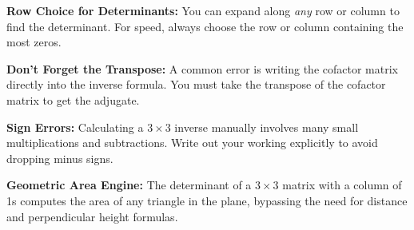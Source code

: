 \begin{takeaways}
\item \textbf{Row Choice for Determinants:} You can expand along \emph{any} row or column to find the determinant. For speed, always choose the row or column containing the most zeros.
\item \textbf{Don't Forget the Transpose:} A common error is writing the cofactor matrix directly into the inverse formula. You must take the transpose of the cofactor matrix to get the adjugate.
\item \textbf{Sign Errors:} Calculating a $3 \times 3$ inverse manually involves many small multiplications and subtractions. Write out your working explicitly to avoid dropping minus signs.
\item \textbf{Geometric Area Engine:} The determinant of a $3 \times 3$ matrix with a column of 1s computes the area of any triangle in the plane, bypassing the need for distance and perpendicular height formulas.
\end{takeaways}
